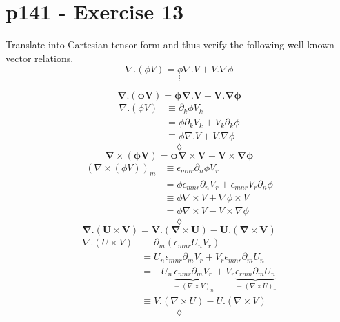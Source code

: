 \section{p141 - Exercise 13}
\begin{tcolorbox}
Translate into Cartesian tensor form and thus verify the following well known vector relations.
$$ \nabla .  \left( \phi V \right) = \phi  \nabla . V + V .\nabla \phi $$
$$ \vdots$$
\end{tcolorbox}
$$ \mathbf{\nabla .  \left( \phi V \right) = \phi  \nabla .V + V .\nabla \phi }$$
\begin{align}
\nabla .  \left( \phi V \right) &\equiv \partial_k \phi V_k\\
&= \phi\partial_k V_k+V_k\partial_k\phi\\
&\equiv \phi\nabla.V+V.\nabla\phi
\end{align}
$$\lozenge$$
$$ \mathbf{\nabla \times  \left( \phi V \right) = \phi  \nabla \times V + V \times \nabla \phi }$$
\begin{align}
\left( \nabla \times  \left( \phi V \right)\right)_m &\equiv \epsilon_{mnr}\partial_n \phi V_r\\
&= \phi\epsilon_{mnr}\partial_n V_r+\epsilon_{mnr}V_r\partial_n\phi\\
&\equiv \phi\nabla\times V+\nabla\phi \times V\\
&= \phi\nabla\times V-  V\times\nabla\phi
\end{align}
$$\lozenge$$
$$ \mathbf{\nabla . \left( U\times V \right) = V .\left( \nabla \times U\right) -  U .\left( \nabla \times V\right)}$$
\begin{align}
\nabla . \left( U\times V \right) &\equiv \partial_m \left(\epsilon_{mnr}U_n V_r\right)\\
&=  U_n\epsilon_{mnr} \partial_m  V_r+ V_r\epsilon_{mnr} \partial_mU_n\\
&=  -U_n\underbrace{\epsilon_{nmr} \partial_m  V_r}_{\equiv \left(\nabla \times V\right)_n}+ V_r\underbrace{\epsilon_{rmn} \partial_m U_n}_{\equiv \left(\nabla \times U\right)_r}\\
&\equiv V .\left( \nabla \times U\right) -  U .\left( \nabla \times V\right)
\end{align}
$$\lozenge$$

